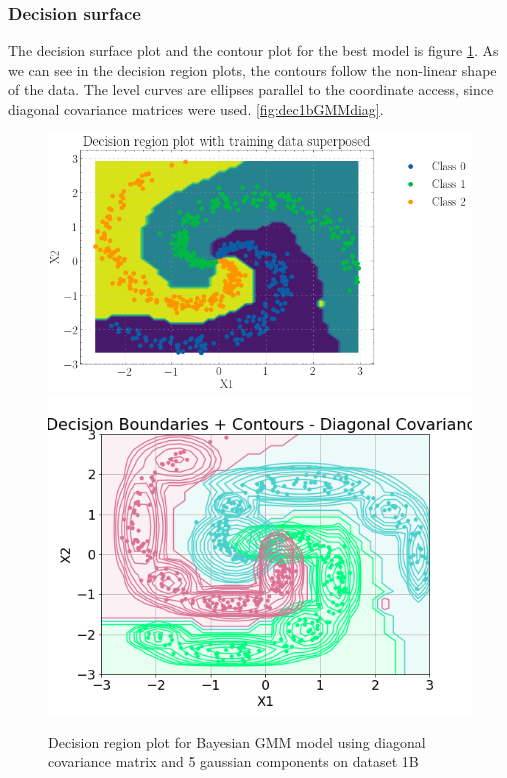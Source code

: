 \documentclass[11pt,a4paper]{article}
\begin{document}
\subsubsection{Decision surface}
The decision surface plot and the contour plot for the best model is figure \ref{fig:dec1bGMMdiag}. As we can see in the decision region plots, the contours follow the non-linear shape of the data. The level curves are ellipses parallel to the coordinate access, since diagonal covariance matrices were used. \autoref{fig:dec1bGMMdiag}.
\begin{figure}[H]
    \centering
    \hspace{4em}\includegraphics[scale=0.5]{images/1B/decisionReg_ds2.png}
    \includegraphics[scale=0.5]{images/1B/contour1b.png}
    \caption{Decision region plot for Bayesian GMM model using diagonal covariance matrix and 5 gaussian components on dataset 1B}
    \label{fig:dec1bGMMdiag}
\end{figure}
\end{document}
